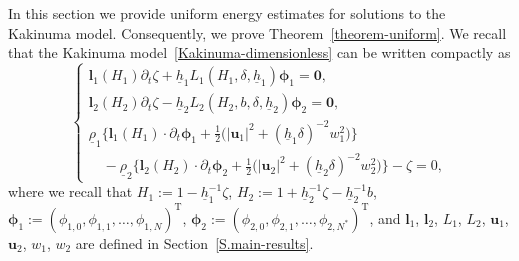 \documentclass[11pt,leqno]{article}
\numberwithin{equation}{section}
\numberwithin{figure}{section}
\begin{document}
In this section we provide uniform energy estimates for solutions to the Kakinuma model. 
Consequently, we prove Theorem~\ref{theorem-uniform}. 
We recall that the Kakinuma model~\eqref{Kakinuma-dimensionless} can be written compactly as 
%
\begin{equation}\label{Kakinuma-approx}
\begin{cases}
 \displaystyle
 {\bm l}_1(H_1)\partial_t\zeta + \underline{h}_1 L_1(H_1,\delta,\underline{h}_1){\bm \phi}_1 = {\bm 0}, \\
 \displaystyle
 {\bm l}_2(H_2)\partial_t\zeta - \underline{h}_2 L_2(H_2,b,\delta,\underline{h}_2){\bm \phi}_2 = {\bm 0}, \\
 \underline{\rho}_1\bigl\{ {\bm l}_1(H_1) \cdot \partial_t{\bm \phi}_1 
   + \frac12\bigl( |{\bm u}_1|^2 + (\underline{h}_1\delta)^{-2} w_1^2 \bigr) \bigr\} \\
 \quad
 - \underline{\rho}_2\bigl\{ {\bm l}_2(H_2) \cdot \partial_t{\bm \phi}_2 
  + \frac12\bigl( |{\bm u}_2|^2 +  (\underline{h}_2\delta)^{-2} w_2^2 \bigr) \bigr\} 
 - \zeta = 0, 
\end{cases}
\end{equation}
%
where we recall that $H_1 := 1 - \underline{h}_1^{-1}\zeta$, $H_2:= 1 + \underline{h}_2^{-1}\zeta- \underline{h}_2^{-1}b$, 
${\bm \phi}_1 := (\phi_{1,0},\phi_{1,1},\ldots,\phi_{1,N})^\mathrm{T}$, 
${\bm \phi}_2 := (\phi_{2,0},\phi_{2,1},\ldots,\phi_{2,N^*})^\mathrm{T}$, and 
${\bm l}_1$, ${\bm l}_2$, $L_1$, $L_2$, ${\bm u}_1$, ${\bm u}_2$, $w_1$, $w_2$ are defined in Section~\ref{S.main-results}. 


\end{document}
